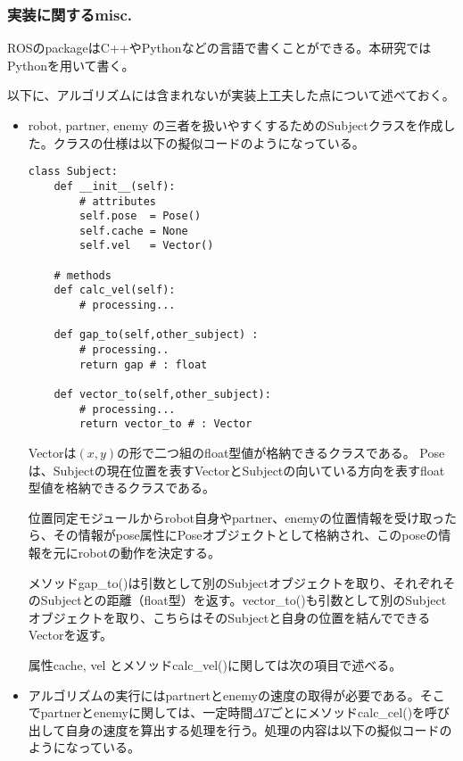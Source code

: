 \documentclass{kuisthesis}
\begin{document}
\vspace{1.0em}

\subsubsection*{実装に関するmisc.}

ROSのpackageはC++やPythonなどの言語で書くことができる。本研究ではPythonを用いて書く。

以下に、アルゴリズムには含まれないが実装上工夫した点について述べておく。

\begin{itemize}
\item robot, partner, enemy の三者を扱いやすくするためのSubjectクラスを作成した。クラスの仕様は以下の擬似コードのようになっている。

\begin{lstlisting}
class Subject:
	def __init__(self):
		# attributes
		self.pose  = Pose()
		self.cache = None
		self.vel   = Vector()

	# methods
	def calc_vel(self):
		# processing...

	def gap_to(self,other_subject) :
		# processing..
		return gap # : float

	def vector_to(self,other_subject):
		# processing...
		return vector_to # : Vector
\end{lstlisting}

Vectorは$(x,y)$の形で二つ組のfloat型値が格納できるクラスである。
Poseは、Subjectの現在位置を表すVectorとSubjectの向いている方向を表すfloat型値を格納できるクラスである。

位置同定モジュールからrobot自身やpartner、enemyの位置情報を受け取ったら、その情報がpose属性にPoseオブジェクトとして格納され、このposeの情報を元にrobotの動作を決定する。

メソッドgap\_to()は引数として別のSubjectオブジェクトを取り、それぞれそのSubjectとの距離（float型）を返す。vector\_to()も引数として別のSubjectオブジェクトを取り、こちらはそのSubjectと自身の位置を結んでできるVectorを返す。

属性cache, vel とメソッドcalc\_vel()に関しては次の項目で述べる。

\vspace{1.0em}

\item アルゴリズムの実行にはpartnertとenemyの速度の取得が必要である。そこでpartnerとenemyに関しては、一定時間$\Delta T$ごとにメソッドcalc\_cel()を呼び出して自身の速度を算出する処理を行う。処理の内容は以下の擬似コードのようになっている。


\end{itemize}
\end{document}

